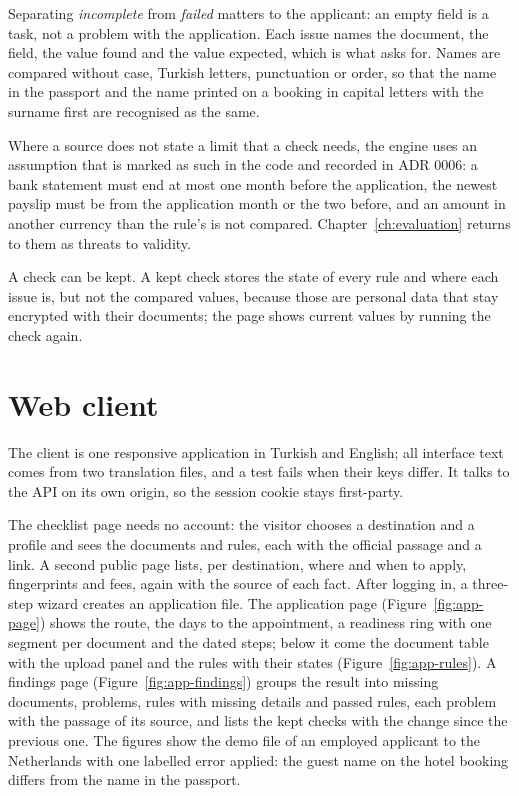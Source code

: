 Separating \emph{incomplete} from \emph{failed} matters to the applicant: an empty field is a
task, not a problem with the application. Each issue names the document, the field, the value
found and the value expected, which is what  asks for. Names are compared without
case, Turkish letters, punctuation or order, so that the name in the passport and the name printed
on a booking in capital letters with the surname first are recognised as the same.

Where a source does not state a limit that a check needs, the engine uses an assumption that is
marked as such in the code and recorded in ADR 0006: a bank statement must end at most one month
before the application, the newest payslip must be from the application month or the two before,
and an amount in another currency than the rule's is not compared. Chapter~\ref{ch:evaluation}
returns to them as threats to validity.

A check can be kept. A kept check stores the state of every rule and where each issue is, but not
the compared values, because those are personal data that stay encrypted with their documents;
the page shows current values by running the check again.

\section{Web client}\label{sec:web}
The client is one responsive application in Turkish and English; all interface text comes from
two translation files, and a test fails when their keys differ. It talks to the API on its own
origin, so the session cookie stays first-party.

The checklist page needs no account: the visitor chooses a destination and a profile and sees the
documents and rules, each with the official passage and a link. A second public page lists, per
destination, where and when to apply, fingerprints and fees, again with the source of each fact.
After logging in, a three-step wizard creates an application file. The application page
(Figure~\ref{fig:app-page}) shows the route, the days to the appointment, a readiness ring with
one segment per document and the dated steps; below it come the document table with the upload
panel and the rules with their states (Figure~\ref{fig:app-rules}). A findings page (Figure~\ref{fig:app-findings}) groups the result into missing documents, problems,
rules with missing details and passed rules, each problem with the passage of its source, and
lists the kept checks with the change since the previous one. The figures show the demo file of
an employed applicant to the Netherlands with one labelled error applied: the guest name on the
hotel booking differs from the name in the passport.

